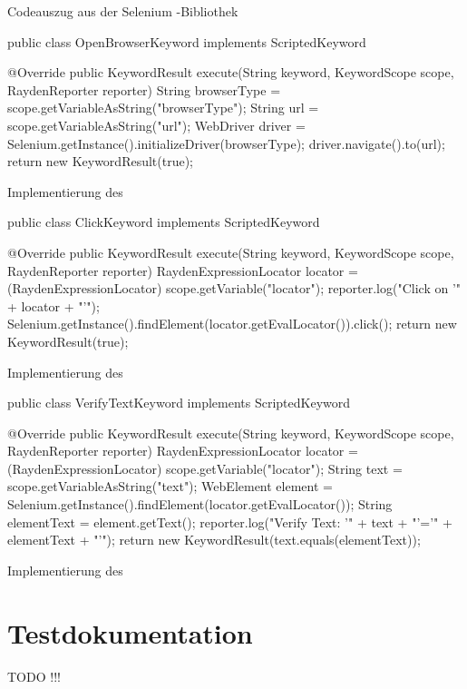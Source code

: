 \begin{program}

\caption{Codeauszug aus der Selenium -Bibliothek}
\label{prog:selenium}
\end{program}


\begin{program}
\begin{JavaCode}
public class OpenBrowserKeyword implements ScriptedKeyword {

	@Override
	public KeywordResult execute(String keyword, KeywordScope scope, RaydenReporter reporter) {
		String browserType = scope.getVariableAsString("browserType");
		String url = scope.getVariableAsString("url");
		WebDriver driver = Selenium.getInstance().initializeDriver(browserType);
		driver.navigate().to(url);
		return new KeywordResult(true);
	}
}
\end{JavaCode}
\caption{Implementierung des }
\label{prog:openBrowserKeyword}
\end{program}


\begin{program}
\begin{JavaCode}
public class ClickKeyword implements ScriptedKeyword {

  @Override
  public KeywordResult execute(String keyword, KeywordScope scope, RaydenReporter reporter) {
    RaydenExpressionLocator locator = (RaydenExpressionLocator) scope.getVariable("locator");
    reporter.log("Click on '" + locator + "'");
    Selenium.getInstance().findElement(locator.getEvalLocator()).click();
    return new KeywordResult(true);
  }
}
\end{JavaCode}
\caption{Implementierung des }
\label{prog:clickKeyword}
\end{program}



\begin{program}
\begin{JavaCode}
public class VerifyTextKeyword implements ScriptedKeyword {

  @Override
  public KeywordResult execute(String keyword, KeywordScope scope, RaydenReporter reporter) {
    RaydenExpressionLocator locator = (RaydenExpressionLocator) scope.getVariable("locator");
    String text = scope.getVariableAsString("text");
    WebElement element = Selenium.getInstance().findElement(locator.getEvalLocator());
    String elementText = element.getText();
    reporter.log("Verify Text: '" + text + "'='" + elementText + "'");
    return new KeywordResult(text.equals(elementText));
  }
}
\end{JavaCode}
\caption{Implementierung des }
\label{prog:verifyTextKeyword}
\end{program}

\todo

\clearpage

\section{Testdokumentation}

TODO !!!
